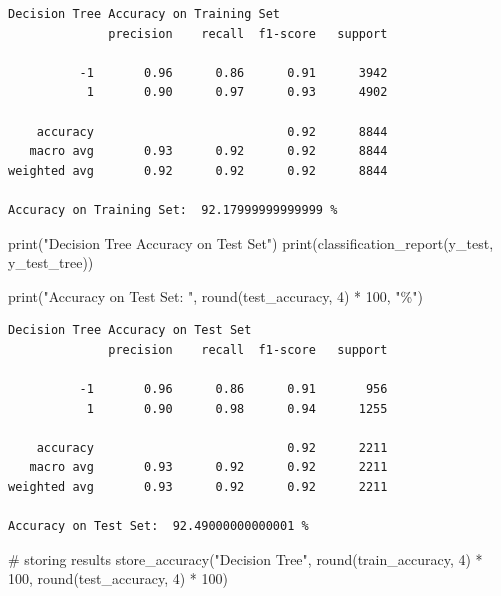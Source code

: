 \documentclass[
  letterpaper,
  DIV=11,
  numbers=noendperiod]{scrartcl}
\newenvironment{Shaded}{\begin{snugshade}}{\end{snugshade}}
\newcommand{\BuiltInTok}[1]{\textcolor[rgb]{0.00,0.23,0.31}{#1}}
\newcommand{\CommentTok}[1]{\textcolor[rgb]{0.37,0.37,0.37}{#1}}
\newcommand{\DecValTok}[1]{\textcolor[rgb]{0.68,0.00,0.00}{#1}}
\newcommand{\NormalTok}[1]{\textcolor[rgb]{0.00,0.23,0.31}{#1}}
\newcommand{\OperatorTok}[1]{\textcolor[rgb]{0.37,0.37,0.37}{#1}}
\newcommand{\StringTok}[1]{\textcolor[rgb]{0.13,0.47,0.30}{#1}}
\begin{document}
\begin{verbatim}
Decision Tree Accuracy on Training Set
              precision    recall  f1-score   support

          -1       0.96      0.86      0.91      3942
           1       0.90      0.97      0.93      4902

    accuracy                           0.92      8844
   macro avg       0.93      0.92      0.92      8844
weighted avg       0.92      0.92      0.92      8844

Accuracy on Training Set:  92.17999999999999 %
\end{verbatim}

\begin{Shaded}
\begin{Highlighting}[]
\BuiltInTok{print}\NormalTok{(}\StringTok{"Decision Tree Accuracy on Test Set"}\NormalTok{)}
\BuiltInTok{print}\NormalTok{(classification\_report(y\_test, y\_test\_tree))}

\BuiltInTok{print}\NormalTok{(}\StringTok{"Accuracy on Test Set: "}\NormalTok{, }\BuiltInTok{round}\NormalTok{(test\_accuracy, }\DecValTok{4}\NormalTok{) }\OperatorTok{*} \DecValTok{100}\NormalTok{, }\StringTok{"\%"}\NormalTok{)}
\end{Highlighting}
\end{Shaded}

\begin{verbatim}
Decision Tree Accuracy on Test Set
              precision    recall  f1-score   support

          -1       0.96      0.86      0.91       956
           1       0.90      0.98      0.94      1255

    accuracy                           0.92      2211
   macro avg       0.93      0.92      0.92      2211
weighted avg       0.93      0.92      0.92      2211

Accuracy on Test Set:  92.49000000000001 %
\end{verbatim}

\begin{Shaded}
\begin{Highlighting}[]
\CommentTok{\# storing results}
\NormalTok{store\_accuracy(}\StringTok{"Decision Tree"}\NormalTok{, }\BuiltInTok{round}\NormalTok{(train\_accuracy, }\DecValTok{4}\NormalTok{) }\OperatorTok{*} \DecValTok{100}\NormalTok{, }\BuiltInTok{round}\NormalTok{(test\_accuracy, }\DecValTok{4}\NormalTok{) }\OperatorTok{*} \DecValTok{100}\NormalTok{)}
\end{Highlighting}
\end{Shaded}
\end{document}
